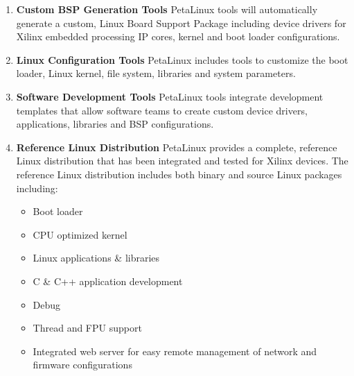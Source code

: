 \begin{enumerate}
  \item \textbf{Custom BSP Generation Tools} PetaLinux tools will automatically generate a custom, Linux Board Support Package including device drivers for Xilinx embedded processing IP cores, kernel and boot loader configurations.
  \item \textbf{Linux Configuration Tools} PetaLinux includes tools to customize the boot loader, Linux kernel, file system, libraries and system parameters.
  \item \textbf{Software Development Tools} PetaLinux tools integrate development templates that allow software teams to create custom device drivers, applications, libraries and BSP configurations.
  \item \textbf{Reference Linux Distribution} PetaLinux provides a complete, reference Linux distribution that has been integrated and tested for Xilinx devices. The reference Linux distribution includes both binary and source Linux packages including:
  \begin{itemize}
    \item Boot loader
    \item CPU optimized kernel
    \item Linux applications \& libraries
    \item C \& C++ application development
    \item Debug
    \item Thread and FPU support
    \item Integrated web server for easy remote management of network and firmware configurations
  \end{itemize}
\end{enumerate}

